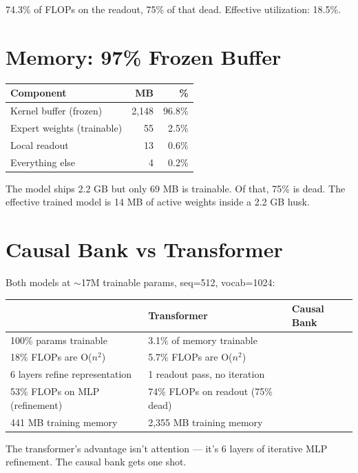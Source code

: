 \documentclass[11pt,a4paper]{report}
\begin{document}
74.3\% of FLOPs on the readout, 75\% of that dead. Effective utilization: 18.5\%.

\section{Memory: 97\% Frozen Buffer}

\begin{center}
\begin{tabular}{lrr}
\toprule
Component & MB & \% \\
\midrule
Kernel buffer (frozen) & 2,148 & 96.8\% \\
Expert weights (trainable) & 55 & 2.5\% \\
Local readout & 13 & 0.6\% \\
Everything else & 4 & 0.2\% \\
\bottomrule
\end{tabular}
\end{center}

The model ships 2.2 GB but only 69 MB is trainable. Of that, 75\% is dead. The effective trained model is 14 MB of active weights inside a 2.2 GB husk.

\section{Causal Bank vs Transformer}

Both models at $\sim$17M trainable params, seq=512, vocab=1024:

\begin{center}
\begin{tabular}{lll}
\toprule
& Transformer & Causal Bank \\
\midrule
100\% params trainable & 3.1\% of memory trainable \\
18\% FLOPs are O($n^2$) & 5.7\% FLOPs are O($n^2$) \\
6 layers refine representation & 1 readout pass, no iteration \\
53\% FLOPs on MLP (refinement) & 74\% FLOPs on readout (75\% dead) \\
441 MB training memory & 2,355 MB training memory \\
\bottomrule
\end{tabular}
\end{center}

The transformer's advantage isn't attention --- it's 6 layers of iterative MLP refinement. The causal bank gets one shot.

\end{document}
